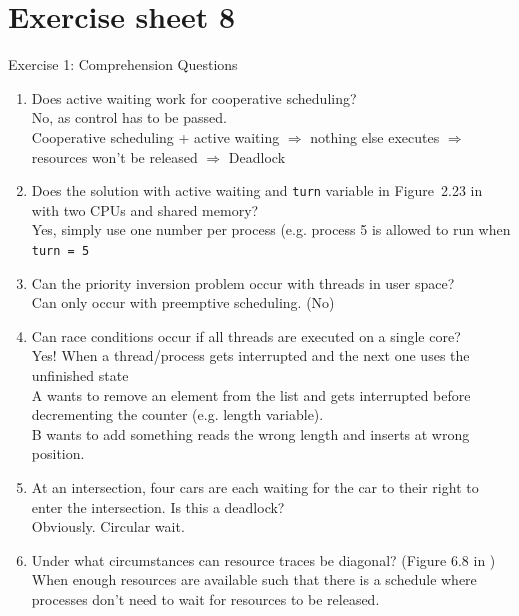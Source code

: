 \documentclass[10pt]{beamer}
\begin{document}
        \section*{Exercise sheet 8}
        \frame{\sectionpage}
        \begin{frame}[allowframebreaks]{Exercise 1: Comprehension Questions}
            \begin{enumerate}
                \item Does active waiting work for cooperative scheduling? \\
                    \alert{No, as control has to be passed. \\
                    Cooperative scheduling + active waiting $\Rightarrow$ nothing else executes $\Rightarrow$ resources won't be released $\Rightarrow$ Deadlock}

                \item Does the solution with active waiting and \texttt{turn} variable in Figure~2.23 in \autocite{tanenbaum} with two CPUs and shared memory? \\
                    \alert{Yes, simply use one number per process (e.g. process 5 is allowed to run when \texttt{turn = 5}}

                \item Can the priority inversion problem occur with threads in user space? \\
                    \alert{Can only occur with preemptive scheduling. (No)}

                \item Can race conditions occur if all threads are executed on a single core? \\
                    \alert{Yes! When a thread/process gets interrupted and the next one uses the unfinished state \\  A wants to remove an element from the list and gets interrupted before decrementing the counter (e.g. length variable). \\
                    B wants to add something reads the wrong length and inserts at wrong position.}

                \item At an intersection, four cars are each waiting for the car to their right to enter the intersection. Is this a deadlock? \\
                    \alert{Obviously. Circular wait.}


                \item Under what circumstances can resource traces be diagonal? (Figure 6.8 in \autocite{tanenbaum}) \\
                    \alert{When enough resources are available such that there is a schedule where processes don't need to wait for resources to be released.}


\end{enumerate}
\end{frame}
\end{document}
